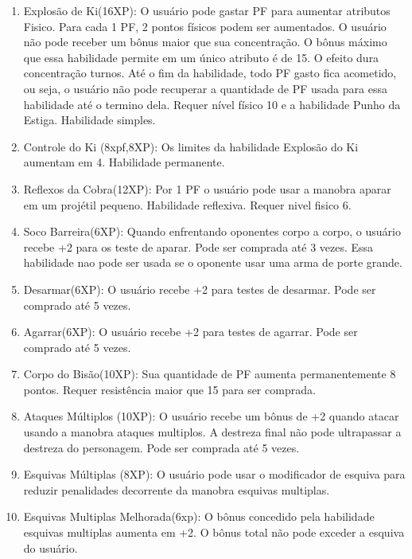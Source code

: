\begin{enumerate}
		\item Explosão de Ki(16XP): O usuário pode gastar PF para aumentar atributos Fisico. Para cada 1 PF, 2 pontos físicos podem ser aumentados. O usuário não pode receber um bônus maior que sua concentração. O bônus máximo que essa habilidade permite em um único atributo é de 15. O efeito dura concentração turnos. Até o fim da habilidade, todo PF gasto fica acometido, ou seja, o usuário não pode recuperar a quantidade de PF usada para essa habilidade até o termino dela. Requer nível físico 10 e a habilidade Punho da Estiga. Habilidade simples.
 
		\item Controle do Ki (8xpf,8XP): Os limites da habilidade Explosão do Ki aumentam em 4. Habilidade permanente.

		\item Reflexos da Cobra(12XP): Por 1 PF o usuário pode usar a manobra aparar em um projétil pequeno. Habilidade reflexiva. Requer nivel fisico 6.

  	\item Soco Barreira(6XP): Quando enfrentando oponentes corpo a corpo, o usuário recebe +2 para os teste de aparar. Pode ser comprada até 3 vezes. Essa habilidade nao pode ser usada se o oponente usar uma arma de porte grande.
  
  	\item Desarmar(6XP): O usuário recebe +2 para testes de desarmar. Pode ser comprado até 5 vezes.
  
  	\item Agarrar(6XP): O usuário recebe +2 para testes de agarrar. Pode ser comprado até 5 vezes.
  
	\item Corpo do Bisão(10XP): Sua quantidade de PF aumenta permanentemente 8 pontos. Requer resistência maior que 15 para ser comprada.

	\item Ataques Múltiplos (10XP): O usuário recebe um bônus de +2 quando atacar usando a manobra ataques multiplos. A destreza final não pode ultrapassar a destreza do personagem. Pode ser comprada até 5 vezes. 

	\item Esquivas Múltiplas (8XP): O usuário pode usar o modificador de esquiva para reduzir penalidades decorrente da manobra esquivas multiplas. 

	\item Esquivas Multiplas Melhorada(6xp): O bônus concedido pela habilidade esquivas multiplas aumenta em +2. O bônus total não pode exceder a esquiva do usuário.
  

\end{enumerate}
